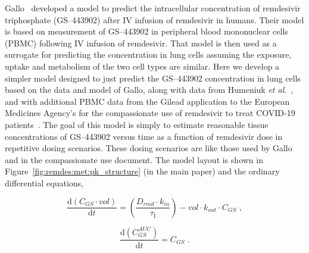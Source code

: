 
Gallo~\cite{gallo_hybrid_2021} developed a model to predict the intracellular concentration of rem\-des\-ivir triphosphate (GS--443902) after IV infusion of remdesivir in humans. Their model is based on measurement of GS--443902 in peripheral blood mononuclear cells (PBMC) following IV infusion of remdesivir. That model is then used as a surrogate for predicting the concentration in lung cells assuming the exposure, uptake and metab\-o\-lism of the two cell types are similar. Here we develop a simpler model designed to just predict the GS--443902 concentration in lung cells based on the data and model of Gallo, along with data from Humeniuk \emph{et al.}~\cite{humeniuk_safety_2020}, and with additional PBMC data from the Gilead application to the European Medicines Agency's for the compassionate use of remdesivir to treat COVID-19 patients~\cite{noauthor_copasicomplex_nodate}. The goal of this model is simply to estimate reasonable tissue concentrations of GS--443902 versus time as a function of remdesivir dose in repetitive dosing scenarios. These dosing scenarios are like those used by Gallo and in the compassionate use document. The model layout is shown in Figure~\ref{fig:remdes:met:pk_structure} (in the main paper) and the ordinary differential equations, %


\begin{equation}\label{sup:eq:pk_ode:1}
\frac{\text{d}(C_{GS}\cdot vol)}{\text{d}t} =
\left(\frac{D_{rmd}\cdot k_{in}}{\tau_{\mathrm{I}}}\right)
- vol\cdot k_{out}\cdot C_{GS} \,\,,
\end{equation}



\begin{equation}\label{sup:eq:pk_ode:2}
\frac{\text{d}(C_{GS}^{AUC})}{\text{d}t} = C_{GS}\,\,.
\end{equation}

